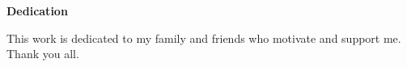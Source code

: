 \clearpage
\begin{centering}
\textbf{Dedication}\\
\vspace{\baselineskip}
\end{centering}

This work is dedicated to my family and friends who motivate and support me. Thank you all.

\clearpage

